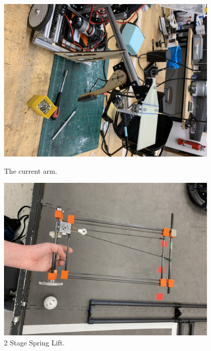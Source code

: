  

\begin{figure}[ht]
\centering
\begin{minipage}[b]{.48\textwidth}
  \centering
  \includegraphics[width=0.95\textwidth]{Meetings/October/10-28-21/10-28-21_Hardware_Figure1 - Nathan Forrer.JPG}
  \caption{The current arm.}
  \label{fig:pic1}
\end{minipage}%
\hfill%
\begin{minipage}[b]{.48\textwidth}
  \centering
  \includegraphics[width=0.95\textwidth]{Meetings/October/10-28-21/10-28-21_Hardware_Figure2 - Nathan Forrer.JPG}
  \caption{2 Stage Spring Lift.}
  \label{fig:pic2}
\end{minipage}
\end{figure}

